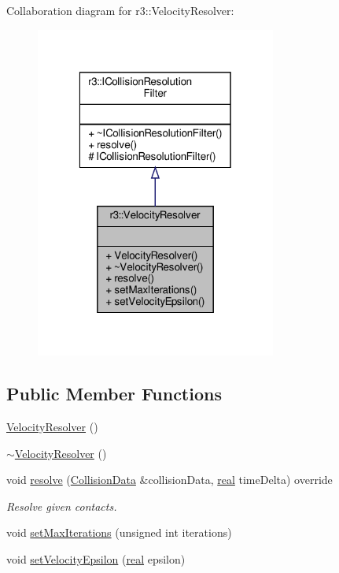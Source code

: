 Collaboration diagram for r3\+:\+:Velocity\+Resolver\+:\nopagebreak
\begin{figure}[H]
\begin{center}
\leavevmode
\includegraphics[width=224pt]{classr3_1_1_velocity_resolver__coll__graph}
\end{center}
\end{figure}
\subsection*{Public Member Functions}
\begin{DoxyCompactItemize}
\item 
\mbox{\hyperlink{classr3_1_1_velocity_resolver_a827566c5d9dca936b4609dc74c587a6f}{Velocity\+Resolver}} ()
\item 
\mbox{\hyperlink{classr3_1_1_velocity_resolver_a508677a0bf2d5258ffc1550677517074}{$\sim$\+Velocity\+Resolver}} ()
\item 
void \mbox{\hyperlink{classr3_1_1_velocity_resolver_a93e8859d1ab3407b073328a58b7caeef}{resolve}} (\mbox{\hyperlink{classr3_1_1_collision_data}{Collision\+Data}} \&collision\+Data, \mbox{\hyperlink{namespacer3_ab2016b3e3f743fb735afce242f0dc1eb}{real}} time\+Delta) override
\begin{DoxyCompactList}\small\item\em Resolve given contacts. \end{DoxyCompactList}\item 
void \mbox{\hyperlink{classr3_1_1_velocity_resolver_af0ec50fd4405261fc97b1985c127d3a6}{set\+Max\+Iterations}} (unsigned int iterations)
\item 
void \mbox{\hyperlink{classr3_1_1_velocity_resolver_a91b4f4f3c064f11983ae9dbe40232c86}{set\+Velocity\+Epsilon}} (\mbox{\hyperlink{namespacer3_ab2016b3e3f743fb735afce242f0dc1eb}{real}} epsilon)
\end{DoxyCompactItemize}
